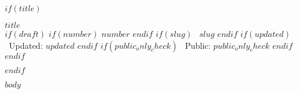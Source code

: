 \documentclass[12pt]{article}
\begin{document}
$if(title)$
\begin{center}
  {\LARGE\bfseries $title$}\\[6pt]
  {\small
    $if(draft)$
    $if(number)$ $number$ $endif$
    $if(slug)$ \textbullet\ $slug$ $endif$
    $if(updated)$ \textbullet\ Updated: $updated$ $endif$
    $if(public_only_check)$ \textbullet\ Public: $public_only_check$ $endif$
    $endif$
  }
\end{center}
\medskip
$endif$


$body$
\end{document}
